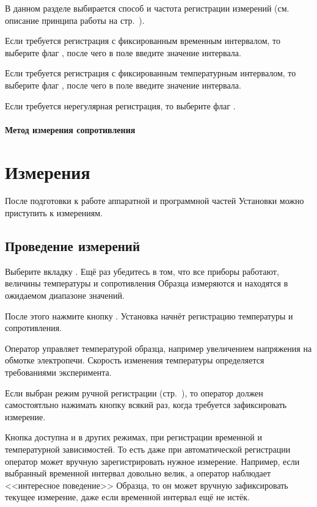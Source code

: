 \documentclass[12pt, a4paper, twocolumn]{report}
\begin{document}
В данном разделе выбирается способ и частота регистрации измерений (см. описание принципа работы на стр.~\pageref{sec_registration_types}).

Если требуется регистрация с фиксированным временным интервалом, то выберите флаг , после чего в поле  введите значение интервала.

Если требуется регистрация с фиксированным температурным интервалом, то выберите флаг , после чего в поле  введите значение интервала.

Если требуется нерегулярная регистрация, то выберите флаг .

\subsubsection{Метод измерения сопротивления}



\chapter{Измерения}

После подготовки к работе аппаратной и программной частей Установки можно приступить к измерениям.

\section{Проведение измерений}

Выберите вкладку . Ещё раз убедитесь в том, что все приборы работают, величины температуры и сопротивления Образца измеряются и находятся в ожидаемом диапазоне значений.

После этого нажмите кнопку . Установка начнёт регистрацию температуры и сопротивления.

Оператор управляет температурой образца, например увеличением напряжения на обмотке электропечи. Скорость изменения температуры определяется требованиями эксперимента.

Если выбран режим ручной регистрации (стр.~\pageref{sec_reg_type_manual}), то оператор должен самостоятльно нажимать кнопку \label{sec_manual} всякий раз, когда требуется зафиксировать измерение.

Кнопка  доступна и в других режимах, при регистрации временной и температурной зависимостей. То есть даже при автоматической регистрации оператор может вручную зарегистрировать нужное измерение. Например, если выбранный временной интервал довольно велик, а оператор наблюдает <<интересное поведение>> Образца, то он может вручную зафиксировать текущее измерение, даже если временной интервал ещё не истёк.
\end{document}
